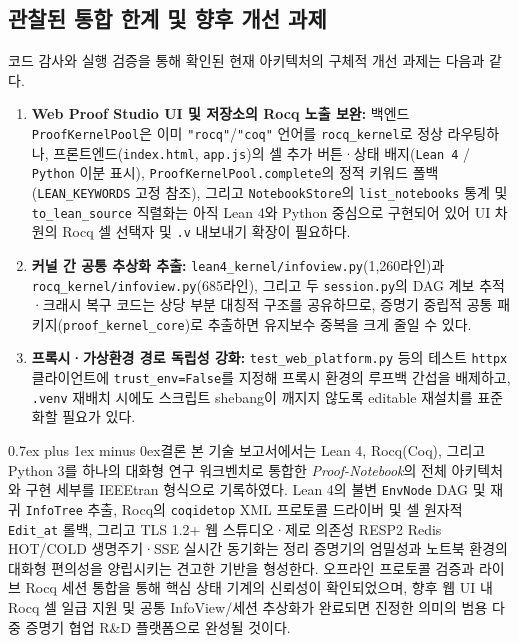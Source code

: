 \documentclass[journal]{IEEEtran}
\makeatletter
\def\section{\@startsection{section}{1}{\z@}{1.5ex plus 1.5ex minus 0.5ex}%
  {0.7ex plus 1ex minus 0ex}{\normalfont\normalsize\centering\bfseries}}%
\newcommand{\code}[1]{\texttt{#1}}
\makeatother
\begin{document}
\subsection{관찰된 통합 한계 및 향후 개선 과제}
코드 감사와 실행 검증을 통해 확인된 현재 아키텍처의 구체적 개선 과제는 다음과 같다.
\begin{enumerate}
  \item \textbf{Web Proof Studio UI 및 저장소의 Rocq 노출 보완:} 백엔드 \code{ProofKernelPool}은 이미 \code{"rocq"}/\code{"coq"} 언어를 \code{rocq\_kernel}로 정상 라우팅하나, 프론트엔드(\code{index.html}, \code{app.js})의 셀 추가 버튼·상태 배지(\code{Lean 4} / \code{Python} 이분 표시), \code{ProofKernelPool.complete}의 정적 키워드 폴백(\code{LEAN\_KEYWORDS} 고정 참조), 그리고 \code{NotebookStore}의 \code{list\_notebooks} 통계 및 \code{to\_lean\_source} 직렬화는 아직 Lean 4와 Python 중심으로 구현되어 있어 UI 차원의 Rocq 셀 선택자 및 \code{.v} 내보내기 확장이 필요하다.
  \item \textbf{커널 간 공통 추상화 추출:} \code{lean4\_kernel/infoview.py}(1,260라인)과 \code{rocq\_kernel/infoview.py}(685라인), 그리고 두 \code{session.py}의 DAG 계보 추적·크래시 복구 코드는 상당 부분 대칭적 구조를 공유하므로, 증명기 중립적 공통 패키지(\code{proof\_kernel\_core})로 추출하면 유지보수 중복을 크게 줄일 수 있다.
  \item \textbf{프록시·가상환경 경로 독립성 강화:} \code{test\_web\_platform.py} 등의 테스트 \code{httpx} 클라이언트에 \code{trust\_env=False}를 지정해 프록시 환경의 루프백 간섭을 배제하고, \code{.venv} 재배치 시에도 스크립트 shebang이 깨지지 않도록 editable 재설치를 표준화할 필요가 있다.
\end{enumerate}

\section{결론}
본 기술 보고서에서는 Lean 4, Rocq(Coq), 그리고 Python 3를 하나의 대화형 연구 워크벤치로 통합한 \textit{Proof-Notebook}의 전체 아키텍처와 구현 세부를 IEEEtran 형식으로 기록하였다. Lean 4의 불변 \code{EnvNode} DAG 및 재귀 \code{InfoTree} 추출, Rocq의 \code{coqidetop} XML 프로토콜 드라이버 및 셀 원자적 \code{Edit\_at} 롤백, 그리고 TLS 1.2+ 웹 스튜디오·제로 의존성 RESP2 Redis HOT/COLD 생명주기·SSE 실시간 동기화는 정리 증명기의 엄밀성과 노트북 환경의 대화형 편의성을 양립시키는 견고한 기반을 형성한다. 오프라인 프로토콜 검증과 라이브 Rocq 세션 통합을 통해 핵심 상태 기계의 신뢰성이 확인되었으며, 향후 웹 UI 내 Rocq 셀 일급 지원 및 공통 InfoView/세션 추상화가 완료되면 진정한 의미의 범용 다중 증명기 협업 R\&D 플랫폼으로 완성될 것이다.



\end{document}
